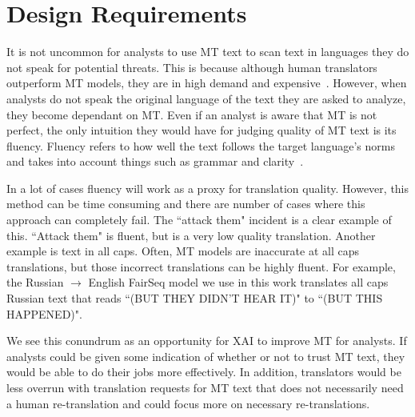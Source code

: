 
\section{Design Requirements}
\label{sec:design_requirements}

It is not uncommon for analysts to use MT text to scan text in languages they do not speak for potential threats. This is because although human translators outperform MT models, they are in high demand and expensive~\cite{mauvcec2019machine}. However, when analysts do not speak the original language of the text they are asked to analyze, they become %
dependant on MT. Even if an analyst is aware that MT is not perfect, the only intuition they would have for judging quality of MT text is its fluency. Fluency refers to how well the text follows the target language's norms and takes into account things such as grammar and clarity~\cite{mauvcec2019machine}. 


In a lot of cases fluency will work as a proxy for translation quality. However, this method can be time consuming and there are number of cases where this approach can completely fail. The ``attack them" incident is a clear example of this. ``Attack them" is fluent, but is a very low quality translation. Another example is text in all caps. Often, MT models are inaccurate at all caps translations, %
but those incorrect translations can be highly fluent. For example, the Russian $\rightarrow$ English FairSeq model we use in this work translates all caps Russian text that reads ``(BUT THEY DIDN'T HEAR IT)" to ``(BUT THIS HAPPENED)".        

We see this conundrum as an opportunity for XAI to improve MT for analysts. If analysts could be given some indication of whether or not to trust MT text, they would be able to do their jobs more effectively. In addition, translators would be less overrun with translation requests for MT text that does not necessarily need a human re-translation and could focus more on necessary re-translations.

